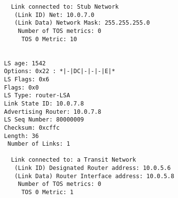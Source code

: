\begin{lstlisting}
    Link connected to: Stub Network
     (Link ID) Net: 10.0.7.0
     (Link Data) Network Mask: 255.255.255.0
      Number of TOS metrics: 0
       TOS 0 Metric: 10


  LS age: 1542
  Options: 0x22 : *|-|DC|-|-|-|E|*
  LS Flags: 0x6  
  Flags: 0x0
  LS Type: router-LSA
  Link State ID: 10.0.7.8 
  Advertising Router: 10.0.7.8
  LS Seq Number: 80000009
  Checksum: 0xcffc
  Length: 36
   Number of Links: 1

    Link connected to: a Transit Network
     (Link ID) Designated Router address: 10.0.5.6
     (Link Data) Router Interface address: 10.0.5.8
      Number of TOS metrics: 0
       TOS 0 Metric: 1
\end{lstlisting}
